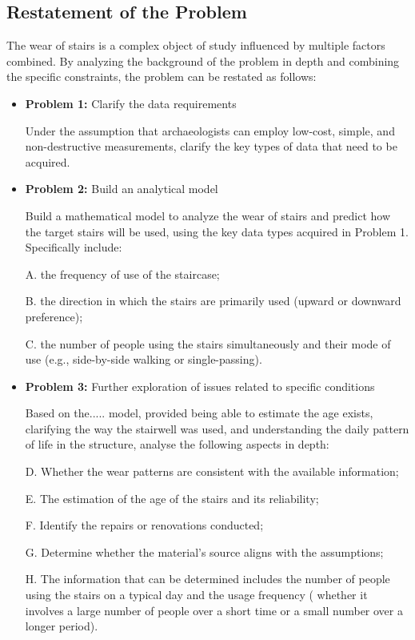 \documentclass{mcmthesis}
\begin{document}
\subsection{Restatement of the Problem}
The wear of stairs is a complex object of study influenced by multiple factors combined. By analyzing the background of the problem in depth and combining the specific constraints, the problem can be restated as follows:
\begin{itemize}
\item \textbf{Problem 1:}
Clarify the data requirements

Under the assumption that archaeologists can employ low-cost, simple, and non-destructive measurements, clarify the key types of data that need to be acquired.

\item \textbf{Problem 2:}
Build an analytical model

Build a mathematical model to analyze the wear of stairs and predict how the target stairs will be used, using the key data types acquired in Problem 1. Specifically include:
\hspace{2em} %
\begin{flushleft}
A. the frequency of use of the staircase;

B. the direction in which the stairs are primarily used (upward or downward preference);

C. the number of people using the stairs simultaneously and their mode of use (e.g., side-by-side walking or single-passing).

\end{flushleft}

\item \textbf{Problem 3:}
Further exploration of issues related to specific conditions

Based on the..... model, provided being able to estimate the age exists, clarifying the way the stairwell was used, and understanding the daily pattern of life in the structure, analyse the following aspects in depth:

\hspace{2em} %
\begin{flushleft}
  
  D. Whether the wear patterns are consistent with the available information; 

  E. The estimation of the age of the stairs and its reliability;

  F. Identify the repairs or renovations conducted;

  G. Determine whether the material's source aligns with the assumptions;

  H. The information that can be determined includes the number of people using the stairs on a typical day and the usage frequency ( whether it involves a large number of people over a short time or a small number over a longer period).

\end{flushleft}
\end{itemize}
\end{document}
